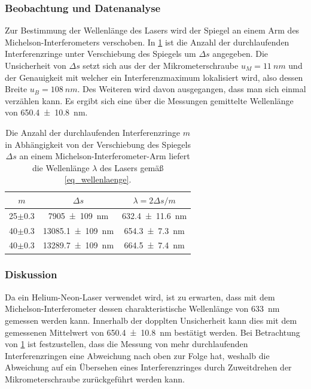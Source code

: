 \documentclass[
	a4paper,
	12pt,
	pagesize,
	ngerman
]{scrartcl}
\begin{document}
	\subsubsection{Beobachtung und Datenanalyse}
	Zur Bestimmung der Wellenlänge des Lasers wird der Spiegel an einem Arm des Michelson-Interferometers verschoben.
	In \cref{tb_lambda} ist die Anzahl der durchlaufenden Interferenzringe unter Verschiebung des Spiegels um $\Delta s$ angegeben.
	Die Unsicherheit von $\Delta s$ setzt sich aus der der Mikrometerschraube $u_M=\SI{11}{nm}$ und der Genauigkeit mit welcher ein Interferenzmaximum lokalisiert wird, also dessen Breite $u_B=\SI{108}{nm}$.
	Des Weiteren wird davon ausgegangen, dass man sich einmal verzählen kann.
	Es ergibt sich eine über die Messungen gemittelte Wellenlänge von \SI{650.4+-10.8}{nm}.

	\begin{table}[H]
		\centering
		\begin{tabular}{| c | c | c |}
			\hline
			  $m$ &  $\Delta s$ & $\lambda=2 \Delta s/m$\\ \hline
				25$\pm$0.3 & \SI{7905+-109}{nm} & \SI{632.4+-11.6}{nm}\\
				40$\pm$0.3& \SI{13085.1+-109}{nm} & \SI{654.3+-7.3}{nm}\\
				40$\pm$0.3& \SI{13289.7+-109}{nm} & \SI{664.5+-7.4}{nm}\\
				\hline
		\end{tabular}
		\caption{Die Anzahl der durchlaufenden Interferenzringe $m$ in Abhängigkeit von der Verschiebung des Spiegels $\Delta s$ an einem Michelson-Interferometer-Arm liefert die Wellenlänge $\lambda$ des Lasers gemäß \cref{eq_wellenlaenge}. }
		\label{tb_lambda}
	\end{table}


	\subsubsection{Diskussion}

	Da ein Helium-Neon-Laser verwendet wird, ist zu erwarten, dass mit dem Michelson-Interferometer dessen charakteristische Wellenlänge von \SI{633}{nm} gemessen werden kann.
	Innerhalb der dopplten Unsicherheit kann dies mit dem gemessenen Mittelwert von \SI{650,4\pm 10,8}{nm} bestätigt werden.
	Bei Betrachtung von \cref{tb_lambda} ist festzustellen, dass die Messung von mehr durchlaufenden Interferenzringen eine Abweichung nach oben zur Folge hat, weshalb die Abweichung auf ein Übersehen eines Interferenzringes durch Zuweitdrehen der Mikrometerschraube zurückgeführt werden kann.
\end{document}
